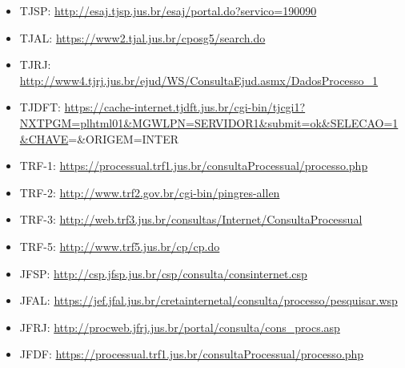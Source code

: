\documentclass[12pt]{article}
\begin{document}
\begin{itemize}
\item
  TJSP: \url{http://esaj.tjsp.jus.br/esaj/portal.do?servico=190090}
\item
  TJAL: \url{https://www2.tjal.jus.br/cposg5/search.do}
\item
  TJRJ:
  \url{http://www4.tjrj.jus.br/ejud/WS/ConsultaEjud.asmx/DadosProcesso_1}
\item
  TJDFT:
  \url{https://cache-internet.tjdft.jus.br/cgi-bin/tjcgi1?NXTPGM=plhtml01\&MGWLPN=SERVIDOR1\&submit=ok\&SELECAO=1\&CHAVE}=\&ORIGEM=INTER
\item
  TRF-1:
  \url{https://processual.trf1.jus.br/consultaProcessual/processo.php}
\item
  TRF-2: \url{http://www.trf2.gov.br/cgi-bin/pingres-allen}
\item
  TRF-3:
  \url{http://web.trf3.jus.br/consultas/Internet/ConsultaProcessual}
\item
  TRF-5: \url{http://www.trf5.jus.br/cp/cp.do}
\item
  JFSP: \url{http://csp.jfsp.jus.br/csp/consulta/consinternet.csp}
\item
  JFAL:
  \url{https://jef.jfal.jus.br/cretainternetal/consulta/processo/pesquisar.wsp}
\item
  JFRJ: \url{http://procweb.jfrj.jus.br/portal/consulta/cons_procs.asp}
\item
  JFDF:
  \url{https://processual.trf1.jus.br/consultaProcessual/processo.php}
\end{itemize}
\end{document}
